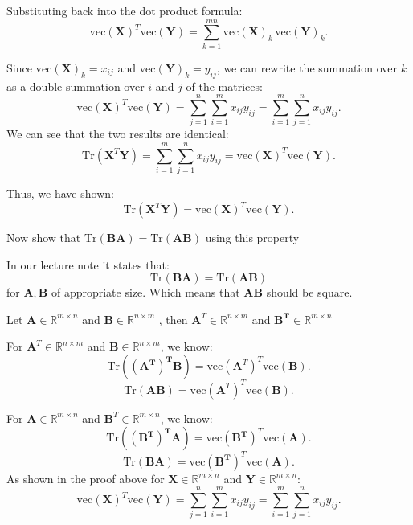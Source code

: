 \documentclass[12pt]{article}
\newcommand{\bmat}[1]{\mathbf{#1}} %
\begin{document}
Substituting back into the dot product formula:
\[
\text{vec}(\mathbf{X})^T \text{vec}(\mathbf{Y}) = \sum_{k=1}^{mn} \text{vec}(\mathbf{X})_k \, \text{vec}(\mathbf{Y})_k.
\]

Since \( \text{vec}(\mathbf{X})_k = x_{ij} \) and \( \text{vec}(\mathbf{Y})_k = y_{ij} \), we can rewrite the summation over \( k \) as a double summation over \( i \) and \( j \) of the matrices:
\[
\text{vec}(\mathbf{X})^T \text{vec}(\mathbf{Y}) = \sum_{j=1}^n \sum_{i=1}^m x_{ij} y_{ij} = \sum_{i=1}^m \sum_{j=1}^n x_{ij} y_{ij}.
\]
We can see that the two results are identical:
\[
\text{Tr}(\mathbf{X}^T \mathbf{Y}) = \sum_{i=1}^m \sum_{j=1}^n x_{ij} y_{ij} = \text{vec}(\mathbf{X})^T \text{vec}(\mathbf{Y}).
\]

Thus, we have shown:
\[
\text{Tr}(\mathbf{X}^T \mathbf{Y}) = \text{vec}(\mathbf{X})^T \text{vec}(\mathbf{Y}).
\]
\vspace{\baselineskip}

Now show that \( \text{Tr}(\mathbf{BA}) = \text{Tr}(\mathbf{AB}) \) using this property

In our lecture note it states that:
\[
\text{Tr}(\mathbf{BA}) = \text{Tr}(\mathbf{AB}) 
\]
for $\bmat{A}, \bmat{B}$ of appropriate size.
Which means that $\bmat{AB}$ should be square.

Let \( \mathbf{A} \in \mathbb{R}^{m \times n} \) and \( \mathbf{B} \in \mathbb{R}^{n \times m} \)
, then \( \mathbf{A}^T \in \mathbb{R}^{n \times m} \) and \( \mathbf{B^T} \in \mathbb{R}^{m \times n} \)


\vspace{\baselineskip}

For \( \mathbf{A}^T \in \mathbb{R}^{n \times m} \) and \( \mathbf{B} \in \mathbb{R}^{n \times m} \), we know:
\[
\text{Tr}(\mathbf{(A^{T})^T B}) = \text{vec}(\mathbf{A}^T)^T \text{vec}(\mathbf{B}).
\]
\[
\text{Tr}(\mathbf{A B}) = \text{vec}(\mathbf{A}^T)^T \text{vec}(\mathbf{B}).
\]

For \( \mathbf{A} \in \mathbb{R}^{m \times n} \) and \( \mathbf{B}^T \in \mathbb{R}^{m \times n} \), we know:
\[
\text{Tr}(\mathbf{(B^{T})^T A}) = \text{vec}(\mathbf{B^T})^T \text{vec}(\mathbf{A}).
\]
\[
\text{Tr}(\mathbf{B A}) = \text{vec}(\mathbf{B^T})^T \text{vec}(\mathbf{A}).
\]
As shown in the proof above for  \( \bmat{X} \in \mathbb{R}^{m \times n} \) and \( \bmat{Y} \in \mathbb{R}^{m \times n} \):
\[
\text{vec}(\mathbf{X})^T \text{vec}(\mathbf{Y}) = \sum_{j=1}^n \sum_{i=1}^m x_{ij} y_{ij} = \sum_{i=1}^m \sum_{j=1}^n x_{ij} y_{ij}.
\]
\end{document}
